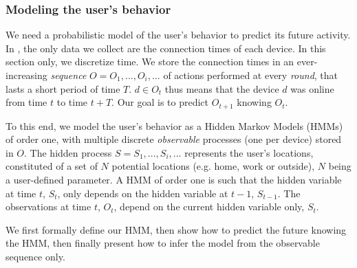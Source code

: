 \subsubsection{Modeling the user's behavior}
\label{sub:a_model_of_the_user_s_behavior}

We need a probabilistic model of the user's behavior to predict its future activity.
In \name, the only data we collect are the connection times of each device.
In this section only, we discretize time. 
We store the connection times in an ever-increasing \emph{sequence} $O=O_1, ..., O_i, ...$ of actions performed at every \emph{round}, that lasts a short period of time $T$. 
$d \in O_t$ thus means that the device $d$ was online from time $t$ to time $t+T$.
Our goal is to predict $O_{t+1}$ knowing $O_t$.

To this end, we model the user's behavior as a Hidden Markov Models (HMMs) of order one, with multiple discrete \emph{observable} processes (one per device) stored in $O$. 
The hidden process $S=S_1, ..., S_i, ...$ represents the user's locations, constituted of a set of $N$ potential locations (e.g. home, work or outside), $N$ being a user-defined parameter.
A HMM of order one is such that the hidden variable at time $t$, $S_t$, only depends on the hidden variable at $t-1$, $S_{t-1}$.
The observations at time $t$, $O_t$, depend on the current hidden variable only, $S_t$.

We first formally define our HMM, then show how to predict the future knowing the HMM, then finally present how to infer the model from the observable sequence only.





